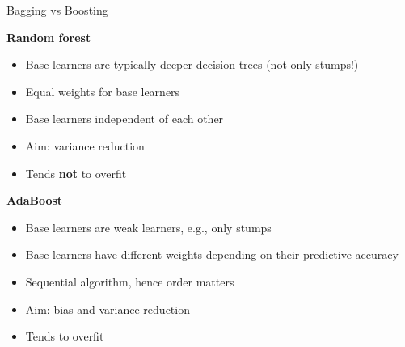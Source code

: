 \documentclass[11pt,compress,t,notes=noshow, xcolor=table]{beamer}
\begin{document}
\begin{vbframe}{Bagging vs Boosting}

\begin{minipage}[t]{0.47\textwidth}
  \textbf{Random forest}
  \begin{itemize}
    \item Base learners are typically deeper decision trees (not only stumps!)
    \item Equal weights for base learners
    \item Base learners independent of each other
    \item Aim: variance reduction
    \item Tends \textbf{not} to overfit
  \end{itemize}
\end{minipage}%
\begin{minipage}[t]{0.06\textwidth}
  \phantom{foo}
\end{minipage}%
\begin{minipage}[t]{0.47\textwidth}
  \textbf{AdaBoost}
  \begin{itemize}
    \item Base learners are weak learners, e.g., only stumps
    \item Base learners have different weights depending on their predictive 
    accuracy
    \item Sequential algorithm, hence order matters
    \item Aim: bias and variance reduction
    \item Tends to overfit
  \end{itemize}
\end{minipage}

\end{vbframe}

\end{document}
